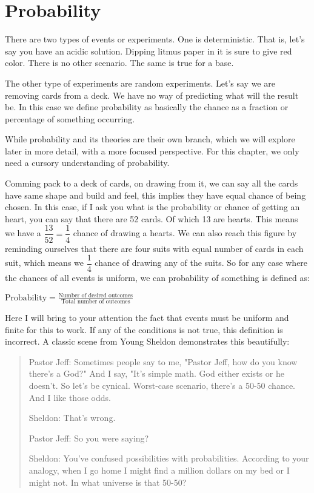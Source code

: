 \section{Probability}
There are two types of events or experiments. One is deterministic.
That is, let's say you have an acidic solution. Dipping litmus paper
in it is sure to give red color. There is no other scenario. The same is true for a base.\par
The other type of experiments are random experiments. Let's say we are removing cards from a deck. We have no way of predicting what will the result be. In this case we define probability as basically the chance as a fraction or percentage of something occurring. \par
While probability and its  theories are their own branch, which we will explore later in more detail, with a more focused perspective. For this chapter, we only need a cursory understanding of probability.\par
Comming pack to a deck of cards, on drawing from it, we can say all the cards have same shape and build and feel, this implies they have equal chance of being chosen. In this case, if I ask you what is the probability or chance of getting an heart, you can say that there are 52 cards. Of which 13 are hearts. This means we
have a $\dfrac{13}{52}=\dfrac{1}{4}$ chance of drawing a hearts. We can also reach this figure by reminding ourselves that there are four suits with equal number of cards in each suit, which means
we $\dfrac{1}{4}$ chance of drawing any of the suits. So for any case where the chances of all events is uniform,
we can probability of something is defined as:
\begin{definition}
    $\text{Probability} = \frac{\text{Number of desired outcomes}}{\text{Total number of outcomes}}$
\end{definition}
Here I will bring to your attention the fact that events must be uniform and finite for this to work. If any of the conditions is not true, this definition is incorrect. A classic scene from Young Sheldon
demonstrates this beautifully:
\begin{quotation}
Pastor Jeff: Sometimes people say to me, "Pastor Jeff, how do you know there's a God?" 
And I say, "It's simple math. God either exists or he doesn't. So let's be cynical. 
Worst-case scenario, there's a 50-50 chance. And I like those odds.\par
Sheldon: That's wrong. \par
Pastor Jeff: So you were saying? \par
Sheldon: You've confused possibilities with probabilities. According to your analogy, 
when I go home I might find a million dollars on my bed or I might not. In what 
universe is that 50-50?
\end{quotation}
